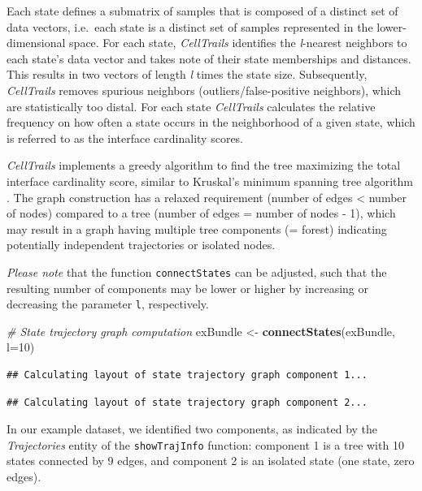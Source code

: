 \documentclass[]{book}
\newenvironment{Shaded}{\begin{snugshade}}{\end{snugshade}}
\newcommand{\KeywordTok}[1]{\textcolor[rgb]{0.13,0.29,0.53}{\textbf{#1}}}
\newcommand{\DataTypeTok}[1]{\textcolor[rgb]{0.13,0.29,0.53}{#1}}
\newcommand{\DecValTok}[1]{\textcolor[rgb]{0.00,0.00,0.81}{#1}}
\newcommand{\StringTok}[1]{\textcolor[rgb]{0.31,0.60,0.02}{#1}}
\newcommand{\CommentTok}[1]{\textcolor[rgb]{0.56,0.35,0.01}{\textit{#1}}}
\newcommand{\NormalTok}[1]{#1}
\theoremstyle{definition}
\theoremstyle{definition}
\theoremstyle{definition}
\theoremstyle{remark}
\begin{document}
Each state defines a submatrix of samples that is composed of a distinct
set of data vectors, i.e.~each state is a distinct set of samples
represented in the lower-dimensional space. For each state,
\emph{CellTrails} identifies the \emph{l}-nearest neighbors to each
state's data vector and takes note of their state memberships and
distances. This results in two vectors of length \emph{l} times the
state size. Subsequently, \emph{CellTrails} removes spurious neighbors
(outliers/false-positive neighbors), which are statistically too distal.
For each state \emph{CellTrails} calculates the relative frequency on
how often a state occurs in the neighborhood of a given state, which is
referred to as the interface cardinality scores.

\emph{CellTrails} implements a greedy algorithm to find the tree
maximizing the total interface cardinality score, similar to Kruskal's
minimum spanning tree algorithm \citep{kruskal1956}. The graph
construction has a relaxed requirement (number of edges \textless{}
number of nodes) compared to a tree (number of edges = number of nodes -
1), which may result in a graph having multiple tree components (=
forest) indicating potentially independent trajectories or isolated
nodes.

\emph{Please note} that the function \texttt{connectStates} can be
adjusted, such that the resulting number of components may be lower or
higher by increasing or decreasing the parameter \texttt{l},
respectively.

\begin{Shaded}
\begin{Highlighting}[]
\CommentTok{# State trajectory graph computation}
\NormalTok{exBundle <-}\StringTok{ }\KeywordTok{connectStates}\NormalTok{(exBundle, }\DataTypeTok{l=}\DecValTok{10}\NormalTok{)}
\end{Highlighting}
\end{Shaded}

\begin{verbatim}
## Calculating layout of state trajectory graph component 1...
\end{verbatim}

\begin{verbatim}
## Calculating layout of state trajectory graph component 2...
\end{verbatim}

In our example dataset, we identified two components, as indicated by
the \emph{Trajectories} entity of the \texttt{showTrajInfo} function:
component 1 is a tree with 10 states connected by 9 edges, and component
2 is an isolated state (one state, zero edges).
\end{document}
